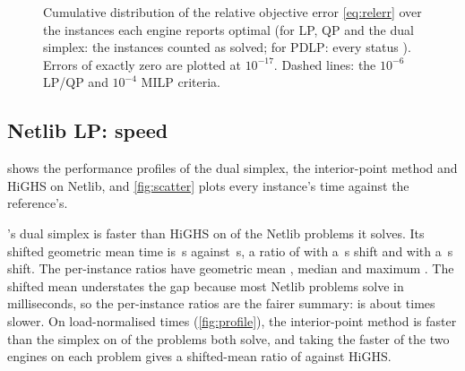 \begin{figure}[tbp]
\centering
{}
\caption[Distribution of relative objective errors]{Cumulative distribution of the relative
objective error \eqref{eq:relerr} over the instances each engine reports optimal (for LP, QP and the
dual simplex: the instances counted as solved; for PDLP: every status ). Errors of
exactly zero are plotted at $10^{-17}$. Dashed lines: the $10^{-6}$ LP/QP and $10^{-4}$ MILP criteria.}
\label{fig:ecdf}
\end{figure}

\subsection{Netlib LP: speed}
 shows the performance profiles of the dual simplex, the interior-point method and
HiGHS on Netlib, and \cref{fig:scatter} plots every instance's time against the reference's.

\begin{honestbox}
\nirnay{}'s dual simplex is faster than HiGHS on \nFasterSpx{} of the \nSpx{} Netlib problems it solves.
Its shifted geometric mean time is \sgmSpx\,s against \sgmSpxRef\,s, a ratio of \ratioSpx{} with a
\shiftA\,s shift and \ratioSpxTenShift{} with a \shiftB\,s shift. The per-instance ratios have
geometric mean \gmrSpx{}, median \medrSpx{} and maximum \maxrSpx{}. The shifted mean understates the
gap because most Netlib problems solve in milliseconds, so the per-instance ratios are the fairer
summary: \nirnay{} is about \gmrSpx{} times slower. On load-normalised times (\cref{fig:profile}), the
interior-point method is faster than the simplex on \nIpmFasterThanSpx{} of the \nBothSolved{} problems
both solve, and taking the faster of the two engines on each problem gives a shifted-mean ratio of
\bestOfTwoRatio{} against HiGHS.
\end{honestbox}

